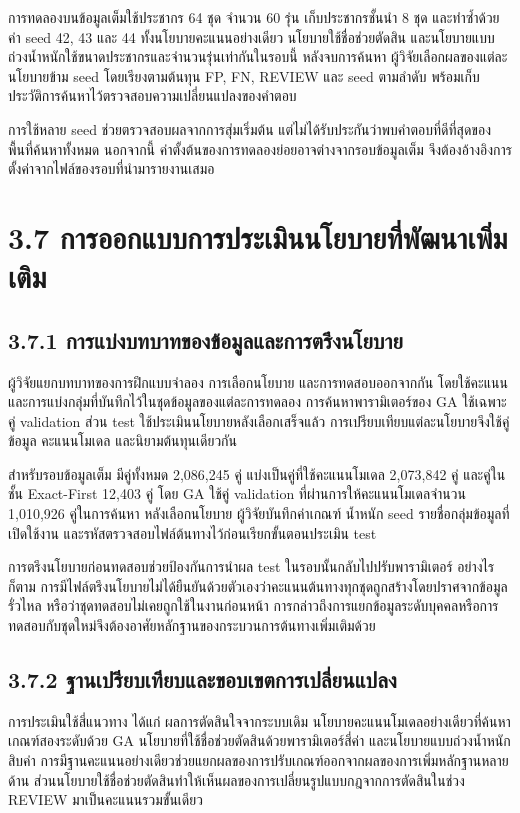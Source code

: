 การทดลองบนข้อมูลเต็มใช้ประชากร 64 ชุด จำนวน 60 รุ่น เก็บประชากรชั้นนำ 8 ชุด และทำซ้ำด้วยค่า seed 42, 43 และ 44 ทั้งนโยบายคะแนนอย่างเดียว นโยบายใช้ชื่อช่วยตัดสิน และนโยบายแบบถ่วงน้ำหนักใช้ขนาดประชากรและจำนวนรุ่นเท่ากันในรอบนี้ หลังจบการค้นหา ผู้วิจัยเลือกผลของแต่ละนโยบายข้าม seed โดยเรียงตามต้นทุน FP, FN, REVIEW และ seed ตามลำดับ พร้อมเก็บประวัติการค้นหาไว้ตรวจสอบความเปลี่ยนแปลงของคำตอบ

การใช้หลาย seed ช่วยตรวจสอบผลจากการสุ่มเริ่มต้น แต่ไม่ได้รับประกันว่าพบคำตอบที่ดีที่สุดของพื้นที่ค้นหาทั้งหมด นอกจากนี้ ค่าตั้งต้นของการทดลองย่อยอาจต่างจากรอบข้อมูลเต็ม จึงต้องอ้างอิงการตั้งค่าจากไฟล์ของรอบที่นำมารายงานเสมอ

\section*{3.7 การออกแบบการประเมินนโยบายที่พัฒนาเพิ่มเติม}
\subsection*{3.7.1 การแบ่งบทบาทของข้อมูลและการตรึงนโยบาย}
ผู้วิจัยแยกบทบาทของการฝึกแบบจำลอง การเลือกนโยบาย และการทดสอบออกจากกัน โดยใช้คะแนนและการแบ่งกลุ่มที่บันทึกไว้ในชุดข้อมูลของแต่ละการทดลอง การค้นหาพารามิเตอร์ของ GA ใช้เฉพาะคู่ validation ส่วน test ใช้ประเมินนโยบายหลังเลือกเสร็จแล้ว การเปรียบเทียบแต่ละนโยบายจึงใช้คู่ข้อมูล คะแนนโมเดล และนิยามต้นทุนเดียวกัน

สำหรับรอบข้อมูลเต็ม มีคู่ทั้งหมด 2,086,245 คู่ แบ่งเป็นคู่ที่ใช้คะแนนโมเดล 2,073,842 คู่ และคู่ในชั้น Exact-First 12,403 คู่ โดย GA ใช้คู่ validation ที่ผ่านการให้คะแนนโมเดลจำนวน 1,010,926 คู่ในการค้นหา หลังเลือกนโยบาย ผู้วิจัยบันทึกค่าเกณฑ์ น้ำหนัก seed รายชื่อกลุ่มข้อมูลที่เปิดใช้งาน และรหัสตรวจสอบไฟล์ต้นทางไว้ก่อนเรียกขั้นตอนประเมิน test

การตรึงนโยบายก่อนทดสอบช่วยป้องกันการนำผล test ในรอบนั้นกลับไปปรับพารามิเตอร์ อย่างไรก็ตาม การมีไฟล์ตรึงนโยบายไม่ได้ยืนยันด้วยตัวเองว่าคะแนนต้นทางทุกชุดถูกสร้างโดยปราศจากข้อมูลรั่วไหล หรือว่าชุดทดสอบไม่เคยถูกใช้ในงานก่อนหน้า การกล่าวถึงการแยกข้อมูลระดับบุคคลหรือการทดสอบกับชุดใหม่จึงต้องอาศัยหลักฐานของกระบวนการต้นทางเพิ่มเติมด้วย

\subsection*{3.7.2 ฐานเปรียบเทียบและขอบเขตการเปลี่ยนแปลง}
การประเมินใช้สี่แนวทาง ได้แก่ ผลการตัดสินใจจากระบบเดิม นโยบายคะแนนโมเดลอย่างเดียวที่ค้นหาเกณฑ์สองระดับด้วย GA นโยบายที่ใช้ชื่อช่วยตัดสินด้วยพารามิเตอร์สี่ค่า และนโยบายแบบถ่วงน้ำหนักสิบค่า การมีฐานคะแนนอย่างเดียวช่วยแยกผลของการปรับเกณฑ์ออกจากผลของการเพิ่มหลักฐานหลายด้าน ส่วนนโยบายใช้ชื่อช่วยตัดสินทำให้เห็นผลของการเปลี่ยนรูปแบบกฎจากการตัดสินในช่วง REVIEW มาเป็นคะแนนรวมขั้นเดียว

